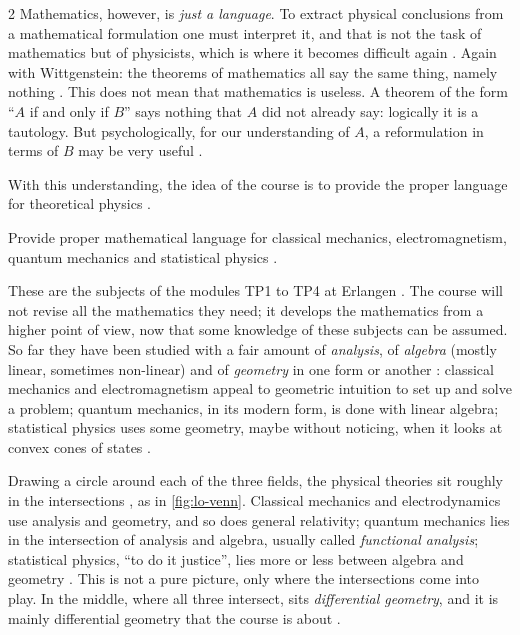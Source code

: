 \begin{paracol}{2}
Mathematics, however, is \emph{just a language}. To extract physical conclusions from a mathematical
formulation one must interpret it, and that is not the task of mathematics but of physicists, which is where
it becomes difficult again . Again with Wittgenstein: the theorems of mathematics all say the
same thing, namely nothing . This does not mean that mathematics is useless. A theorem of the
form ``$A$ if and only if $B$'' says nothing that $A$ did not already say: logically it is a tautology. But
psychologically, for our understanding of $A$, a reformulation in terms of $B$ may be very useful
.

With this understanding, the idea of the course is to provide the proper language for theoretical physics
.

\begin{intuition}
Provide proper mathematical language for classical mechanics, electromagnetism, quantum mechanics and
statistical physics .
\end{intuition}

These are the subjects of the modules TP1 to TP4 at Erlangen . The course will not revise all
the mathematics they need; it develops the mathematics from a higher point of view, now that some knowledge
of these subjects can be assumed. So far they have been studied with a fair amount of \emph{analysis}, of
\emph{algebra} (mostly linear, sometimes non-linear) and of \emph{geometry} in one form or another
: classical mechanics and electromagnetism appeal to geometric intuition to set up and solve a
problem; quantum mechanics, in its modern form, is done with linear algebra; statistical physics uses some
geometry, maybe without noticing, when it looks at convex cones of states .

Drawing a circle around each of the three fields, the physical theories sit roughly in the intersections
, as in \cref{fig:lo-venn}. Classical mechanics and electrodynamics use analysis and geometry,
and so does general relativity; quantum mechanics lies in the intersection of analysis and algebra, usually
called \emph{functional analysis}; statistical physics, ``to do it justice'', lies more or less between algebra
and geometry . This is not a pure picture, only where the intersections come into play. In the
middle, where all three intersect, sits \emph{differential geometry}, and it is mainly differential geometry
that the course is about .


\end{paracol}
